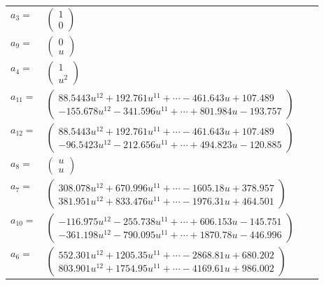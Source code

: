 \documentclass[1p]{elsarticle_modified}
\theoremstyle{definition}
\begin{document}
\begin{tabular}{m{7pt} m{180pt} m{7pt} m{180pt} }
\flushright $a_{3}=$&$\begin{pmatrix}1\\0\end{pmatrix}$ \\
\flushright $a_{9}=$&$\begin{pmatrix}0\\u\end{pmatrix}$ \\
\flushright $a_{4}=$&$\begin{pmatrix}1\\u^2\end{pmatrix}$ \\
\flushright $a_{11}=$&$\begin{pmatrix}88.5443 u^{12}+192.761 u^{11}+\cdots-461.643 u+107.489\\-155.678 u^{12}-341.596 u^{11}+\cdots+801.984 u-193.757\end{pmatrix}$ \\
\flushright $a_{12}=$&$\begin{pmatrix}88.5443 u^{12}+192.761 u^{11}+\cdots-461.643 u+107.489\\-96.5423 u^{12}-212.656 u^{11}+\cdots+494.823 u-120.885\end{pmatrix}$ \\
\flushright $a_{8}=$&$\begin{pmatrix}u\\u\end{pmatrix}$ \\
\flushright $a_{7}=$&$\begin{pmatrix}308.078 u^{12}+670.996 u^{11}+\cdots-1605.18 u+378.957\\381.951 u^{12}+833.476 u^{11}+\cdots-1976.31 u+464.501\end{pmatrix}$ \\
\flushright $a_{10}=$&$\begin{pmatrix}-116.975 u^{12}-255.738 u^{11}+\cdots+606.153 u-145.751\\-361.198 u^{12}-790.095 u^{11}+\cdots+1870.78 u-446.996\end{pmatrix}$ \\
\flushright $a_{6}=$&$\begin{pmatrix}552.301 u^{12}+1205.35 u^{11}+\cdots-2868.81 u+680.202\\803.901 u^{12}+1754.95 u^{11}+\cdots-4169.61 u+986.002\end{pmatrix}$ \\

\end{tabular}
\end{document}
